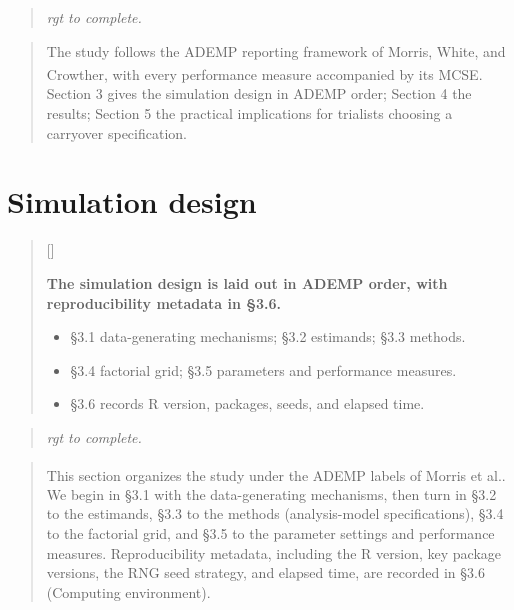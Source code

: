 \documentclass[
  11pt,
]{article}
\newcounter{pgraph}
\newenvironment{bullets}{%
  \stepcounter{pgraph}%
  \begin{quote}\small\sffamily\color[gray]{0.30}%
  {\normalfont\scriptsize\color[gray]{0.58}[\thepgraph]\enspace}}{%
  \end{quote}}
\newenvironment{rgt}{%
  \begin{quote}\small\itshape\color[RGB]{20,60,160}}{%
  \end{quote}}
\newenvironment{orig}{%
  \begin{quote}\normalsize\color[gray]{0.55}}{%
  \end{quote}}
\begin{document}
\begin{rgt}
rgt to complete.

\end{rgt}

\begin{orig}
The study follows the ADEMP reporting framework of Morris, White,
and Crowther\textsuperscript{}, with every performance
measure accompanied by its MCSE. Section 3
gives the simulation design in ADEMP order; Section 4 the results;
Section 5 the practical implications for trialists choosing a
carryover specification.

\end{orig}

\section{Simulation design}\label{simulation-design}

\begin{bullets}

\textbf{The simulation design is laid out in ADEMP order, with
reproducibility metadata in §3.6.}

\begin{itemize}\setlength{\itemsep}{2pt}\setlength{\parskip}{0pt}
\item §3.1 data-generating mechanisms; §3.2 estimands; §3.3 methods.
\item §3.4 factorial grid; §3.5 parameters and performance measures.
\item §3.6 records R version, packages, seeds, and elapsed time.
\end{itemize}

\end{bullets}

\begin{rgt}
rgt to complete.

\end{rgt}

\begin{orig}
This section organizes the study under the ADEMP labels of
Morris et al.\textsuperscript{}. We begin in §3.1 with the
data-generating mechanisms, then turn in §3.2 to the estimands,
§3.3 to the methods (analysis-model specifications), §3.4 to the
factorial grid, and §3.5 to the parameter settings and performance
measures. Reproducibility metadata, including the R version, key
package versions, the RNG seed strategy, and elapsed time, are
recorded in §3.6 (Computing environment).

\end{orig}
\end{document}
